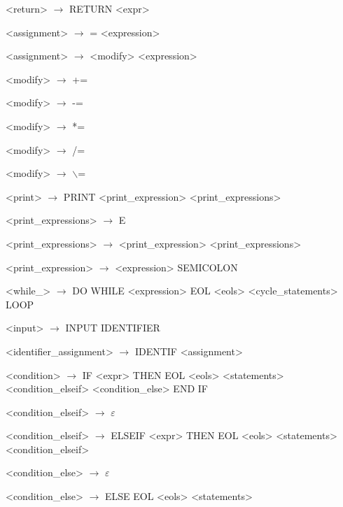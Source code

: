 \begin{normalsize}
\begin{enumerate}
{        \item <return> $\rightarrow$ RETURN <expr>

        \item <assignment> $\rightarrow$ = <expression>
        \item <assignment> $\rightarrow$ <modify> <expression>
        \item <modify> $\rightarrow$ +=
        \item <modify> $\rightarrow$ -=
        \item <modify> $\rightarrow$ *=
        \item <modify> $\rightarrow$ /=
        \item <modify> $\rightarrow$ $\backslash$=

        \item <print> $\rightarrow$ PRINT <print\_expression> <print\_expressions>
        \item <print\_expressions> $\rightarrow$ E
        \item <print\_expressions> $\rightarrow$ <print\_expression> <print\_expressions>
        \item <print\_expression> $\rightarrow$ <expression> SEMICOLON

        \item <while\_> $\rightarrow$ DO WHILE <expression> EOL <eols> <cycle\_statements> LOOP

        \item <input> $\rightarrow$ INPUT IDENTIFIER

        \item <identifier\_assignment> $\rightarrow$  IDENTIF <assignment>

        \item <condition> $\rightarrow$ IF <expr> THEN EOL <eols> <statements> <condition\_elseif> <condition\_else> END IF
        \item <condition\_elseif> $\rightarrow$ $\varepsilon$
        \item <condition\_elseif> $\rightarrow$ ELSEIF <expr> THEN EOL <eols> <statements> <condition\_elseif>

        \item <condition\_else> $\rightarrow$ $\varepsilon$
        \item <condition\_else> $\rightarrow$ ELSE EOL <eols> <statements>

}
\end{enumerate}
\end{normalsize}
